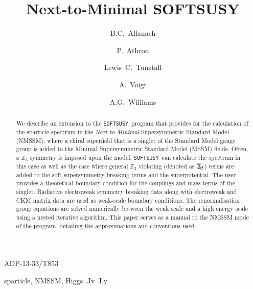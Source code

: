 \documentclass[final,3p,times,pdflatex]{elsarticle}
\def\SOFTSUSY{{\tt SOFTSUSY}}
\newcommand{\Zv}{\,\mathbf{\backslash}\mkern-11.0mu{\mathbb{Z}}_{3}} %
\begin{document}
\begin{frontmatter}

\begin{flushright}
ADP-13-33/T853
\end{flushright}

\title{Next-to-Minimal SOFTSUSY}

\author[damtp]{B.C.~Allanach}
\author[adelaide]{P.~Athron}
\author[adelaide,bern]{Lewis~C.~Tunstall}
\author[dresden]{A.~Voigt}
\author[adelaide]{A.G.~Williams}
\address[damtp]{DAMTP, CMS, University of Cambridge, Wilberforce road, Cambridge, CB3
  0WA, United Kingdom}
\address[adelaide]{ARC Centre of Excellence for Particle Physics at 
the Tera-scale, School of Chemistry and Physics, University of Adelaide, 
Adelaide SA 5005 Australia}
\address[bern]{Albert Einstein Center for Fundamental Physics, Institute for Theoretical Physics, University of Bern, Sidlerstrasse 5, CH-3012 Bern, Switzerland}
\address[dresden]{Institut f\"ur Kern- und Teilchenphysik,
TU Dresden, Zellescher Weg 19, 01069 Dresden, Germany}

\begin{abstract}
  We describe an extension to the
  \SOFTSUSY~program that provides for the calculation of the sparticle spectrum in the
  {\em Next-to-Minimal} Supersymmetric Standard Model (NMSSM), where a chiral
  superfield that is a singlet of the Standard Model gauge group is added to
  the Minimal Supersymmetric Standard Model (MSSM) fields. Often, a $\mathbb{Z}_3$
  symmetry is 
  imposed upon the model. \SOFTSUSY~can calculate the spectrum in this
  case as well as the case where general $\mathbb{Z}_3$ violating (denoted as $\Zv$) terms are
  added to 
  the soft supersymmetry breaking terms and the superpotential. 
  The user provides a theoretical boundary condition for the couplings and
  mass terms of the singlet.
  Radiative electroweak symmetry breaking data along with
  electroweak and CKM matrix data are used
  as weak-scale boundary conditions. 
  The renormalisation group equations are solved
  numerically between the weak scale and a high energy scale using a nested
  iterative algorithm. 
  This paper serves as a manual to the
  NMSSM mode of the program, detailing the approximations and
  conventions used. 
\end{abstract}

\begin{keyword}
sparticle, 
NMSSM, Higgs
.Jv
.Ly
\end{keyword}
\end{frontmatter}
\end{document}
